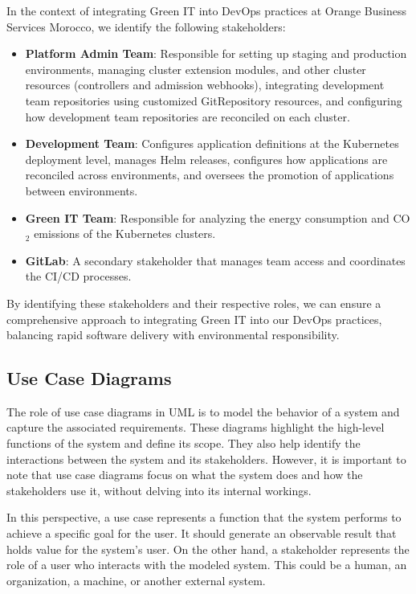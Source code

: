 In the context of integrating Green IT into DevOps practices at Orange Business Services Morocco, we identify the following stakeholders:

\begin{itemize}
  \item \textbf{Platform Admin Team}: Responsible for setting up staging and production environments, managing cluster extension modules, and other cluster resources (controllers and admission webhooks), integrating development team repositories using customized GitRepository resources, and configuring how development team repositories are reconciled on each cluster.
  
  \item \textbf{Development Team}: Configures application definitions at the Kubernetes deployment level, manages Helm releases, configures how applications are reconciled across environments, and oversees the promotion of applications between environments.
  
  \item \textbf{Green IT Team}: Responsible for analyzing the energy consumption and CO$_2$ emissions of the Kubernetes clusters. 
  
  \item \textbf{GitLab}: A secondary stakeholder that manages team access and coordinates the CI/CD processes.
\end{itemize}

By identifying these stakeholders and their respective roles, we can ensure a comprehensive approach to integrating Green IT into our DevOps practices, balancing rapid software delivery with environmental responsibility.

\subsection{Use Case Diagrams}
\label{subsec:use_case_diagrams}

The role of use case diagrams in UML is to model the behavior of a system and capture the associated requirements. These diagrams highlight the high-level functions of the system and define its scope. They also help identify the interactions between the system and its stakeholders. However, it is important to note that use case diagrams focus on what the system does and how the stakeholders use it, without delving into its internal workings.

In this perspective, a use case represents a function that the system performs to achieve a specific goal for the user. It should generate an observable result that holds value for the system's user. On the other hand, a stakeholder represents the role of a user who interacts with the modeled system. This could be a human, an organization, a machine, or another external system.

